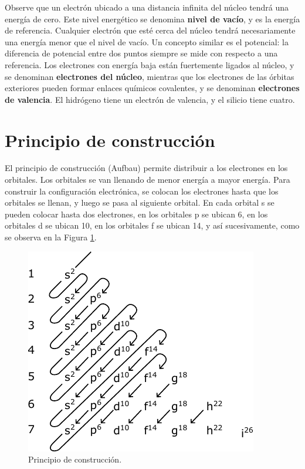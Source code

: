 Observe que un electrón ubicado a una distancia infinita del núcleo tendrá una energía de cero. Este nivel energético se denomina \textbf{nivel de vacío}, y es la energía de referencia. Cualquier electrón que esté cerca del núcleo tendrá necesariamente una energía menor que el nivel de vacío. Un concepto similar es el potencial: la diferencia de potencial entre dos puntos siempre se mide con respecto a una referencia. Los electrones con energía baja están fuertemente ligados al núcleo, y se denominan \textbf{electrones del núcleo}, mientras que los electrones de las órbitas exteriores pueden formar enlaces químicos covalentes, y se denominan \textbf{electrones de valencia}. El hidrógeno tiene un electrón de valencia, y el silicio tiene cuatro.


\section{Principio de construcción}

El principio de construcción (Aufbau) permite distribuir a los electrones en los orbitales. Los orbitales se van llenando de menor energía a mayor energía. Para construir la configuración electrónica, se colocan los electrones hasta que los orbitales se llenan, y luego se pasa al siguiente orbital. En cada orbital s se pueden colocar hasta dos electrones, en los orbitales p se ubican 6, en los orbitales d se ubican 10, en los orbitales f se ubican 14, y así sucesivamente, como se observa en la Figura \ref{principio_aufbau}.

\begin{figure}[H]
    \centering
    \includegraphics{figuras/principio_de_aufbau.pdf}
    \caption{Principio de construcción.}
    \label{principio_aufbau}
\end{figure}

